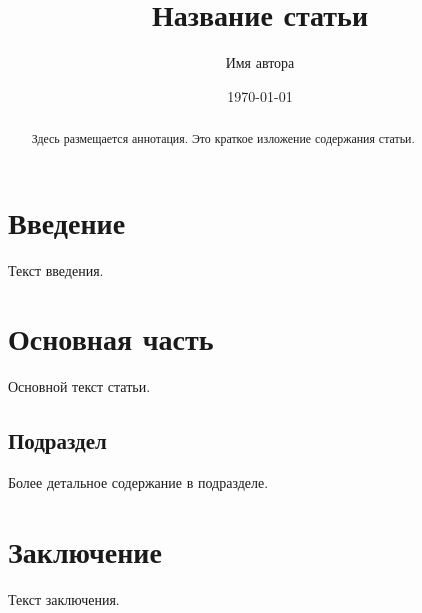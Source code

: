 \documentclass[12pt]{article}
\title{Название статьи}
\author{Имя автора}
\date{\today}
\begin{document}
\maketitle

\begin{abstract}
Здесь размещается аннотация. Это краткое изложение содержания статьи.
\end{abstract}

\section{Введение}

Текст введения.

\section{Основная часть}

Основной текст статьи.

\subsection{Подраздел}

Более детальное содержание в подразделе.

\section{Заключение}

Текст заключения.
\end{document}
